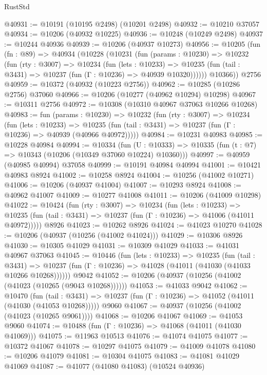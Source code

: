 \begin{lexlean}{RustStd}
\begin{coremodule}
@40931 := @10191 (@10195 @2498) (@10201 @2498)
@40932 := @10210 @37057
@40934 := @10206 (@40932 @10225)
@40936 := @10248 (@10249 @2498)
@40937 := @10244 @40936
@40939 := @10206 (@40937 @10273)
@40956 := @10205
    (fun (fn : @89) =>
    @40934
      (@10228
        (@10231
          (fun (params : @10230) =>
          @10232
            (fun (rty : @3007) =>
            @10234
              (fun (lets : @10233) =>
              @10235 (fun (tail : @3431) => @10237 (fun (Γ : @10236) => @40939 @10320))))))
        @10366))
    @2756
@40959 := @10372 (@40932 (@10223 @2756))
@40962 := @10285 (@10286 @2756) @37060
@40966 := @10206 (@10277 (@40962 @10294) @10298)
@40967 := @10311 @2756
@40972 := @10308 (@10310 @40967 @37063 @10266 @10268)
@40983 := fun (params : @10230) =>
  @10232
    (fun (rty : @3007) =>
    @10234
      (fun (lets : @10233) =>
      @10235 (fun (tail : @3431) => @10237 (fun (Γ : @10236) => @40939 (@40966 @40972)))))
@40984 := @10231 @40983
@40985 := @10228 @40984
@40994 := @10334
    (fun (U : @10333) => @10335 (fun (t : @7) => @10343 (@10206 (@10349 @37060 @10224) @10360)))
@40997 := @40959 (@40985 @40994) @37058
@40999 := @10191 @40984 @40994
@41001 := @10421 @40983 @8924
@41002 := @10258 @8924
@41004 := @10256 (@41002 @10271)
@41006 := @10206 (@40937 @41004)
@41007 := @10293 @8924
@41008 := @40962 @41007
@41009 := @10277 @41008
@41011 := @10206 (@41009 @10298)
@41022 := @10424
    (fun (rty : @3007) =>
    @10234
      (fun (lets : @10233) =>
      @10235 (fun (tail : @3431) => @10237 (fun (Γ : @10236) => @41006 (@41011 @40972)))))
    @8926
@41023 := @10262 @8926
@41024 := @41023 @10270
@41028 := @10206 (@40937 (@10256 (@41002 @41024)))
@41029 := @10306 @8926
@41030 := @10305 @41029
@41031 := @10309 @41029
@41033 := @41031 @40967 @37063
@41045 := @10446
    (fun (lets : @10233) =>
    @10235
      (fun (tail : @3431) =>
      @10237 (fun (Γ : @10236) => @41028 (@41011 (@41030 (@41033 @10266 @10268))))))
    @9042
@41052 := @10206 (@40937 (@10256 (@41002 (@41023 (@10265 (@9043 @10268))))))
@41053 := @41033 @9042
@41062 := @10470
    (fun (tail : @3431) => @10237 (fun (Γ : @10236) => @41052 (@41011 (@41030 (@41053 @10268)))))
    @9060
@41067 := @40937 (@10256 (@41002 (@41023 (@10265 @9061))))
@41068 := @10206 @41067
@41069 := @41053 @9060
@41074 := @10488 (fun (Γ : @10236) => @41068 (@41011 (@41030 @41069)))
@41075 := @11963 @10513
@41076 := @41074 @41075
@41077 := @10372 @41067
@41078 := @10297 @41075
@41079 := @41009 @41078
@41080 := @10206 @41079
@41081 := @10304 @41075
@41083 := @41081 @41029 @41069
@41087 := @41077 (@41080 @41083) (@10524 @40936)

\end{coremodule}
\end{lexlean}
